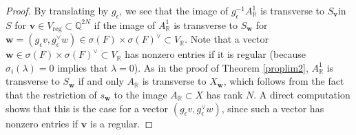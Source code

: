 \documentclass[twoside,a4paper,10pt]{article} %
\newcommand{\8}{\infty}
\newcommand{\vbf}{\mathbf{v}}
\newcommand{\wbf}{\mathbf{w}}
\newcommand{\R}{\mathbb{R}}
\newcommand{\Q}{\mathbb{Q}}
\newcommand{\reg}{\mathrm{reg}}
\theoremstyle{mytheoremstyle}
\theoremstyle{remark}
\numberwithin{equation}{section}
\begin{document}
\begin{proof}  By translating by $g_{\epsilon}$, we see that the image of $g_{\epsilon}^{-1}A^1_\R$ is transverse to $S_\vbf$in $S$ for $\vbf \in V_\reg \subset \Q^{2N}$ if the image of $A^1_\R$ is transverse to $S_\wbf$ for $\wbf=(g_{\epsilon}v,g_{\epsilon}^\vee w) \in \sigma(F) \times \sigma(F)^\vee \subset V_\R$. Note that a vector $\wbf \in \sigma(F) \times \sigma(F)^\vee \subset V_\R$ has nonzero entries if it is regular (because $\sigma_i(\lambda)=0$ implies that $\lambda=0$). As in the proof of Theorem \ref{proplim2}, $A^1_\R$ is transverse to $S_\wbf$ if and only $A_\R$ is transverse to $X_\wbf$, which follows from the fact that the restriction of $s_\wbf$ to  the image $A_\R \subset X$ has rank $N$. A direct computation shows that this is the case for a vector $(g_{\epsilon}v,g_{\epsilon}^\vee w)$, since such a vector has nonzero entries if $\vbf$ is a regular.
\end{proof}
\end{document}
